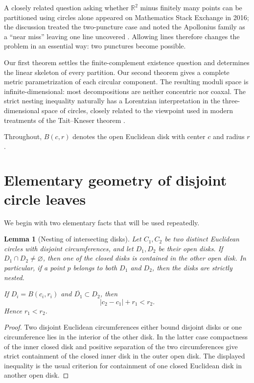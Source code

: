 \documentclass[11pt]{article}
\newtheorem{lemma}[theorem]{Lemma}
\newcommand{\R}{\mathbb{R}}
\newcommand{\ol}{\overline}
\begin{document}
A closely related question asking whether $\R^2$ minus finitely many points can be partitioned using circles alone appeared on Mathematics Stack Exchange in 2016; the discussion treated the two-puncture case and noted the Apollonius family as a ``near miss'' leaving one line uncovered \cite{MSECirclePartition}. Allowing lines therefore changes the problem in an essential way: two punctures become possible.

Our first theorem settles the finite-complement existence question and determines the linear skeleton of every partition. Our second theorem gives a complete metric parametrization of each circular component. The resulting moduli space is infinite-dimensional: most decompositions are neither concentric nor coaxal. The strict nesting inequality naturally has a Lorentzian interpretation in the three-dimensional space of circles, closely related to the viewpoint used in modern treatments of the Tait--Kneser theorem \cite{BorJackmanTabachnikov}.

Throughout, $B(c,r)$ denotes the open Euclidean disk with center $c$ and radius $r$.

\section{Elementary geometry of disjoint circle leaves}

We begin with two elementary facts that will be used repeatedly.

\begin{lemma}[Nesting of intersecting disks]\label{lem:nesting}
Let $C_1,C_2$ be two distinct Euclidean circles with disjoint circumferences, and let $D_1,D_2$ be their open disks. If $D_1\cap D_2\neq\varnothing$, then one of the closed disks is contained in the other open disk. In particular, if a point $p$ belongs to both $D_1$ and $D_2$, then the disks are strictly nested.

If $D_i=B(c_i,r_i)$ and $\ol{D_1}\subset D_2$, then
\[
|c_2-c_1|+r_1<r_2.
\]
Hence $r_1<r_2$.
\end{lemma}

\begin{proof}
Two disjoint Euclidean circumferences either bound disjoint disks or one circumference lies in the interior of the other disk. In the latter case compactness of the inner closed disk and positive separation of the two circumferences give strict containment of the closed inner disk in the outer open disk. The displayed inequality is the usual criterion for containment of one closed Euclidean disk in another open disk.
\end{proof}
\end{document}
